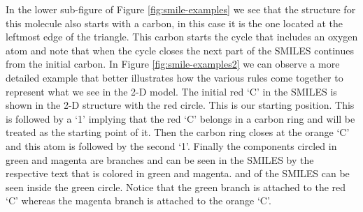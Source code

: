     In the lower sub-figure of  Figure \ref{fig:smile-examples} we see that the structure for this molecule also  starts with a carbon, in this case it is the one located at the leftmost edge of the triangle. This carbon starts the cycle that includes an oxygen atom and note that when the cycle closes the next part of the SMILES continues from the initial carbon. In Figure \ref{fig:smile-examples2} we can observe a more detailed example that better illustrates how the various rules come together to represent what we see in the 2-D model. The initial red `C' in the SMILES is shown in the 2-D structure with the red circle. This is our starting position.  This is followed by a `1' implying that the red `C' belongs in a carbon ring and will be treated as the starting point of it. Then the carbon ring closes at the orange `C' and this atom  is followed by the second `1'. Finally the components circled in  green and magenta are branches and can be seen in the SMILES by the respective text that is colored in green and magenta. 
     and  of the SMILES can be seen inside the green circle. Notice that the green branch is attached to the red `C' whereas the magenta branch is attached to the orange `C'. 

